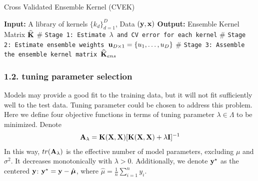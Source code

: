 \documentclass[11pt]{article}
\begin{document}
\begin{algorithm}
\caption{Cross Validated Ensemble Kernel (CVEK)} 
\label{alg:cvke}
\begin{algorithmic}[1]
\newline
\textbf{Input:} A library of kernels $\{k_d\}_{d=1}^D$, Data $({\bf y}, {\bf x})$\newline
\textbf{Output:} Ensemble Kernel Matrix $\widehat{{\bf K}}$\newline
$\#$ \texttt{Stage 1: Estimate $\lambda$ and CV error for each kernel}
\EndFor 
\newline
$\#$ \texttt{Stage 2: Estimate ensemble weights ${\bf u}_{D \times 1} = \{u_1, \dots, u_D\}$}
\newline
$\#$ \texttt{Stage 3: Assemble the ensemble kernel matrix $\widehat{{\bf K}}_{ens}$}
\EndProcedure
\end{algorithmic}
\end{algorithm}

\subsubsection*{{1.2. tuning parameter selection}}
Models may provide a good fit to the training data, but it will not fit sufficiently well to the test data. Tuning parameter could be chosen to address this problem. Here we define four objective functions in terms of tuning parameter $\lambda \in \Lambda$ to be minimized. Denote
\begin{align}
{\bf A}_\lambda={\bf K}({\bf X}, {\bf X})[{\bf K}({\bf X}, {\bf X})+\lambda {\bf I}]^{-1}
\end{align}
In this way, $tr({\bf A}_\lambda)$ is the effective number of model parameters, excluding $\mu$ and $\sigma^2$. It decreases monotonically with $\lambda>0$. Additionally, we denote ${\bf y}^\star$ as the centered ${\bf y}$: ${\bf y}^\star={\bf y}-\hat{\boldsymbol{\mu}}$, where $\hat{\mu}=\frac{1}{n}\sum_{i=1}^ny_i$.
\end{document}
